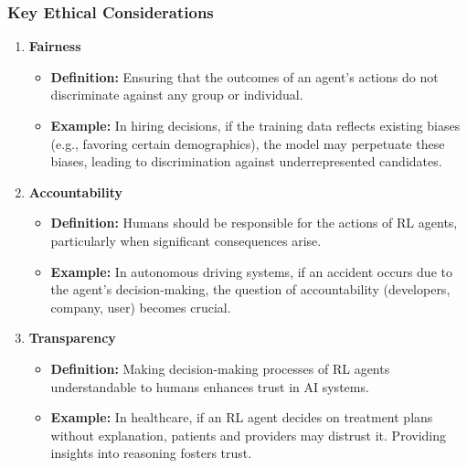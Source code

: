 \documentclass[aspectratio=169]{beamer}
\begin{document}
\begin{frame}[fragile]
    \frametitle{Key Ethical Considerations}
    \begin{enumerate}
        \item \textbf{Fairness}
            \begin{itemize}
                \item \textbf{Definition:} Ensuring that the outcomes of an agent's actions do not discriminate against any group or individual.
                \item \textbf{Example:} In hiring decisions, if the training data reflects existing biases (e.g., favoring certain demographics), the model may perpetuate these biases, leading to discrimination against underrepresented candidates.
            \end{itemize}

        \item \textbf{Accountability}
            \begin{itemize}
                \item \textbf{Definition:} Humans should be responsible for the actions of RL agents, particularly when significant consequences arise.
                \item \textbf{Example:} In autonomous driving systems, if an accident occurs due to the agent's decision-making, the question of accountability (developers, company, user) becomes crucial.
            \end{itemize}

        \item \textbf{Transparency}
            \begin{itemize}
                \item \textbf{Definition:} Making decision-making processes of RL agents understandable to humans enhances trust in AI systems.
                \item \textbf{Example:} In healthcare, if an RL agent decides on treatment plans without explanation, patients and providers may distrust it. Providing insights into reasoning fosters trust.
            \end{itemize}
    \end{enumerate}
\end{frame}
\end{document}
